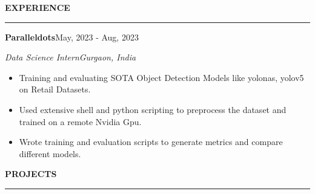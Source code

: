\documentclass[a4paper,12pt]{report}
\begin{document}
 \par
 \vspace{9pt}
 
\noindent 
\textbf{EXPERIENCE} \par
\vspace{2pt}
\hrule
\vspace{6pt}


\noindent 
\textbf{Paralleldots}{\fontsize{9pt}{9pt}\selectfont \hfill  {\fontsize{12pt}{12pt}\selectfont May, 2023 - Aug, 2023}} \par
\noindent 
{\fontsize{12pt}{12pt}\selectfont \textit{Data Science Intern}\hfill\textit{Gurgaon, India}} \par
\noindent 
\begin{itemize}[noitemsep,topsep=0pt]
    \item {\fontsize{12pt}{12pt}\selectfont Training and evaluating SOTA Object Detection Models like yolonas, yolov5 on Retail Datasets.} \par
    \noindent
    \item {\fontsize{12pt}{12pt}\selectfont Used extensive shell and python scripting to preprocess the dataset and trained on a remote Nvidia Gpu.} \par
    \noindent 
    \item {\fontsize{12pt}{12pt}\selectfont Wrote training and evaluation scripts to generate metrics and compare different models. } \par
    \noindent
\end{itemize}



 \par
\vspace{9pt}



\noindent 
\textbf{PROJECTS} \par
\vspace{2pt}
\hrule
\vspace{6pt}
\end{document}

